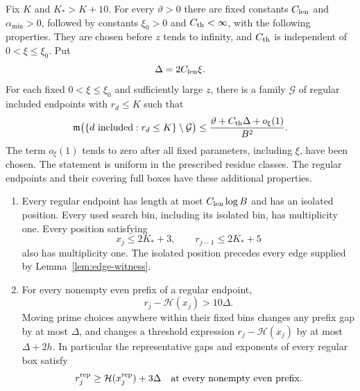 \begin{proposition}\label{prop:regular-boxes}
Fix $K$ and $K_*>K+10$.  For every $\vartheta>0$ there are fixed
constants $C_{\rm len}$ and $\alpha_{\min}>0$, followed by constants
$\xi_0>0$ and $C_{\rm th}<\infty$, with the following properties.
They are chosen before $z$ tends to infinity, and $C_{\rm th}$ is
independent of $0<\xi\le\xi_0$.  Put
\begin{equation}\label{eq:boxes-delta}
 \Delta=2C_{\rm len}\xi.
\end{equation}
For each fixed $0<\xi\le\xi_0$ and sufficiently large $z$, there is
a family $\mathcal G$ of regular included endpoints with $r_d\le K$
such that
\begin{equation}\label{eq:boxes-exception}
 \mathfrak m\bigl(\{d\text{ included}:r_d\le K\}\setminus\mathcal G\bigr)
 \le \frac{\vartheta+C_{\rm th}\Delta+o_\xi(1)}{B^2}.
\end{equation}
The term $o_\xi(1)$ tends to zero after all fixed parameters,
including $\xi$, have been chosen.  The statement is uniform in
the prescribed residue classes.  The regular endpoints and their
covering full boxes have these additional properties.

\begin{enumerate}[label=\textup{(\roman*)}]
\item Every regular endpoint has length at most
$C_{\rm len}\log B$ and has an isolated position.  Every used
search bin, including its isolated bin, has multiplicity one.
Every position satisfying
\[
 x_j\le2K_*+3,\qquad r_{j-1}\le2K_*+5
\]
also has multiplicity one.  The isolated position precedes every
edge supplied by Lemma~\ref{lem:edge-witness}.

\item For every nonempty even prefix of a regular endpoint,
\begin{equation}\label{eq:boxes-threshold-clearance}
 r_j-\mathcal H(x_j)>10\Delta.
\end{equation}
Moving prime choices anywhere within their fixed bins changes any
prefix gap by at most $\Delta$, and changes a threshold expression
$r_j-\mathcal H(x_j)$ by at most $\Delta+2h$.  In particular the
representative gaps and exponents of every regular box satisfy
\begin{equation}\label{eq:boxes-representative-safety}
 r_j^{\rm rep}\ge \mathcal H(x_j^{\rm rep})+3\Delta
 \quad\text{at every nonempty even prefix}.
\end{equation}


\end{enumerate}
\end{proposition}
